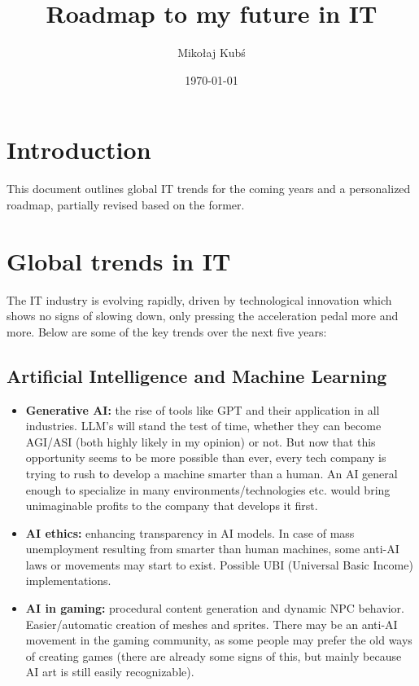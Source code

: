\documentclass{article}
\title{Roadmap to my future in IT}
\author{Mikołaj Kubś}
\date{\today}
\begin{document}
\maketitle

\section{Introduction}
This document outlines global IT trends for the coming years and a personalized roadmap, partially revised based on the former.

\section{Global trends in IT}
The IT industry is evolving rapidly, driven by technological innovation which shows no signs of slowing down, only pressing the acceleration pedal more and more. Below are some of the key trends over the next five years:

\subsection{Artificial Intelligence and Machine Learning}
\begin{itemize}
    \item \textbf{Generative AI:} the rise of tools like GPT and their application in all industries. LLM's will stand the test of time, whether they can become AGI/ASI (both highly likely in my opinion) or not. But now that this opportunity seems to be more possible than ever, every tech company is trying to rush to develop a machine smarter than a human. An AI general enough to specialize in many environments/technologies etc. would bring unimaginable profits to the company that develops it first.
    \item \textbf{AI ethics:} enhancing transparency in AI models. In case of mass unemployment resulting from smarter than human machines, some anti-AI laws or movements may start to exist. Possible UBI (Universal Basic Income) implementations.
    \item \textbf{AI in gaming:} procedural content generation and dynamic NPC behavior. Easier/automatic creation of meshes and sprites. There may be an anti-AI movement in the gaming community, as some people may prefer the old ways of creating games (there are already some signs of this, but mainly because AI art is still easily recognizable).
\end{itemize}
\end{document}
